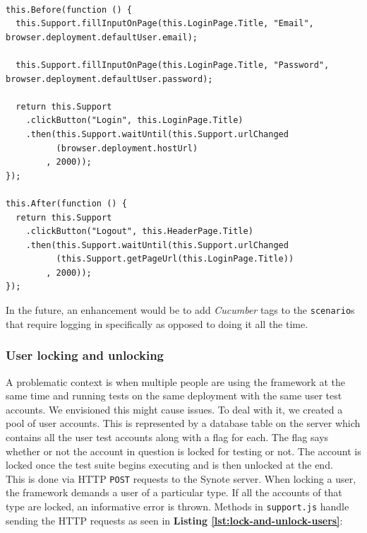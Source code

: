 \begin{listing}[H]
\begin{verbatim}

this.Before(function () {
  this.Support.fillInputOnPage(this.LoginPage.Title, "Email", browser.deployment.defaultUser.email);

  this.Support.fillInputOnPage(this.LoginPage.Title, "Password", browser.deployment.defaultUser.password);

  return this.Support
    .clickButton("Login", this.LoginPage.Title)
    .then(this.Support.waitUntil(this.Support.urlChanged
          (browser.deployment.hostUrl)
        , 2000));
});

this.After(function () {
  return this.Support
    .clickButton("Logout", this.HeaderPage.Title)
    .then(this.Support.waitUntil(this.Support.urlChanged
          (this.Support.getPageUrl(this.LoginPage.Title))
        , 2000));
});

\end{verbatim}
\label{lst:login-and-logout-hooks}
\end{listing}

In the future, an enhancement would be to add \textit{Cucumber} tags to the \texttt{scenario}s that require logging in specifically as opposed to doing it all the time.

\subsubsection{User locking and unlocking}
\label{subsubsec:user-locking-and-unlocking}

A problematic context is when multiple people are using the framework at the same time and running tests on the same deployment with the same user test accounts. We envisioned this might cause issues. To deal with it, we created a pool of user accounts. This is represented by a database table on the server which contains all the user test accounts along with a flag for each. The flag says whether or not the account in question is locked for testing or not. The account is locked once the test suite begins executing and is then unlocked at the end.
\\

This is done via HTTP \texttt{POST} requests to the Synote server. When locking a user, the framework demands a user of a particular type. If all the accounts of that type are locked, an informative error is thrown. Methods in \texttt{support.js} handle sending the HTTP requests as seen in \textbf{Listing \ref{lst:lock-and-unlock-users}}:

